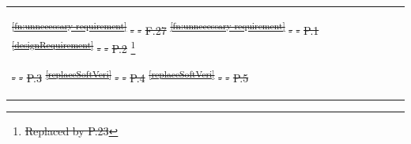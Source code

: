 \documentclass[a4paper,12pt,twoside]{article}
\providecommand{\DIFdeltex}[1]{{\protect\color{red}\sout{#1}}}                      %
\providecommand{\DIFdel}[1]{\texorpdfstring{\DIFdeltex{#1}}{}} %
\begin{document}
\begin{longtable}[]{|m{}| m{} |m{} |m{}|m{}|}
\DIFdel{\textsuperscript{\ref{fn:unnecessary-requirement}}                                                                                     }%
\DIFdel{-        }%
\DIFdel{-            }%
\DIFdel{F.27 }%
\DIFdel{\textsuperscript{\ref{fn:unnecessary-requirement}}                                                                                    }%
\DIFdel{-        }%
\DIFdel{-            }%
\DIFdel{P.1  }%
\DIFdel{\textsuperscript{\ref{designRequirement}}                                                                                                                           }%
\DIFdel{-      }%
\DIFdel{-          }%
\DIFdel{P.2  }%
\footnote{\DIFdel{Replaced by P.23}%
}                                                                       %
\addtocounter{footnote}{-1}%
\DIFdel{-  }%
\DIFdel{-  }%
\DIFdel{P.3  }%
\DIFdel{\textsuperscript{\ref{replaceSoftVeri}}                                                           }%
\DIFdel{-        }%
\DIFdel{-        }%
\DIFdel{P.4  }%
\DIFdel{\textsuperscript{\ref{replaceSoftVeri}}                                                           }%
\DIFdel{-     }%
\DIFdel{-    }%
\DIFdel{P.5  }%

\end{longtable}
\end{document}
